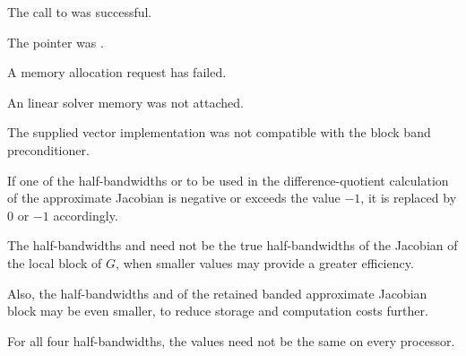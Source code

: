{{  \begin{args}
  \item[\Id{IDALS\_SUCCESS}]
    The call to  was successful.
  \item[\Id{IDALS\_MEM\_NULL}]
    The  pointer was .
  \item[\Id{IDALS\_MEM\_FAIL}]
    A memory allocation request has failed.
  \item[\Id{IDALS\_LMEM\_NULL}]
    An {\idals} linear solver memory was not attached.
  \item[\Id{IDALS\_ILL\_INPUT}]
    The supplied vector implementation was not compatible with the block band preconditioner.
  \end{args}
}
{
  If one of the half-bandwidths  or  to be used in the
  difference-quotient calculation of the approximate Jacobian is negative or
  exceeds the value $-1$, it is replaced by 0 or $-1$
  accordingly.

  The half-bandwidths  and  need not be the true
  half-bandwidths of the Jacobian of the local block of $G$,
  when smaller values may provide a greater efficiency.

  Also, the half-bandwidths  and  of the retained
  banded approximate Jacobian block may be even smaller,
  to reduce storage and computation costs further.

  For all four half-bandwidths, the values need not be the
  same on every processor.
}



}

